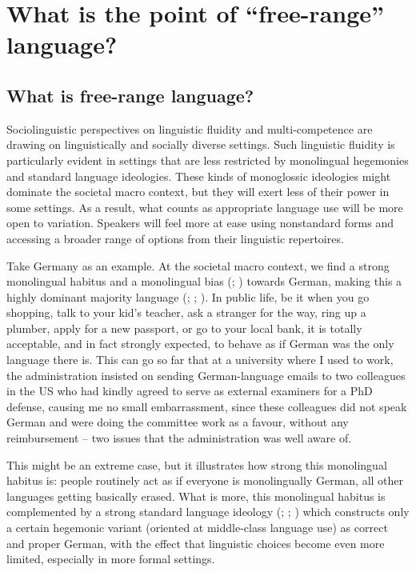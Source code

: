 \chapter{What is the point of “free-range” language?}\label{chap:2}

\section{What is free-range language?}
\label{sec:2.1}

Sociolinguistic perspectives on linguistic fluidity and multi-competence are drawing on linguistically and socially diverse settings. Such linguistic fluidity is particularly evident in settings that are less restricted by monolingual hegemonies and standard language ideologies. These kinds of monoglossic ideologies might dominate the societal macro context, but they will exert less of their power in some settings. As a result, what counts as appropriate language use will be more open to variation. Speakers will feel more at ease using nonstandard forms and accessing a broader range of options from their linguistic repertoires.

Take Germany as an example. At the societal macro context, we find a strong monolingual habitus \citep{Gogolin1994} and a monolingual bias (\citealt{Kachru1994}; \citealt{Cook1997}) towards German, making this a highly dominant majority language (\citealt{Gogolin1994}; \citealt{Fuller2012}; \citealt{Wiese2015}). In public life, be it when you go shopping, talk to your kid’s teacher, ask a stranger for the way, ring up a plumber, apply for a new passport, or go to your local bank, it is totally acceptable, and in fact strongly expected, to behave as if German was the only language there is. This can go so far that at a university where I used to work, the administration insisted on sending German-language emails to two colleagues in the US who had kindly agreed to serve as external examiners for a PhD defense, causing me no small embarrassment, since these colleagues did not speak German and were doing the committee work as a favour, without any reimbursement – two issues that the administration was well aware of.

This might be an extreme case, but it illustrates how strong this monolingual habitus is: people routinely act as if everyone is monolingually German, all other languages getting basically erased. What is more, this monolingual habitus is complemented by a strong standard language ideology (\citealt{Durrell1999}; \citealt{DaviesLanger2006}; \citealt{Davies2012}) which constructs only a certain hegemonic variant (oriented at middle-class language use) as correct and proper German, with the effect that linguistic choices become even more limited, especially in more formal settings.

